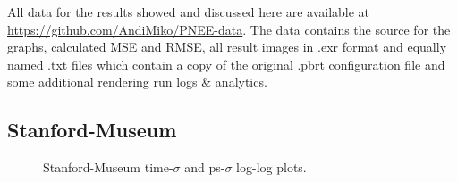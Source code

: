 All data for the results showed and discussed here are available at \url{https://github.com/AndiMiko/PNEE-data}. The data contains the source for the graphs, calculated MSE and RMSE, all result images in .exr format and equally named .txt files which contain a copy of the original .pbrt configuration file and some additional rendering run logs \& analytics.

\subsection{Stanford-Museum}

\begin{figure}
    \centering
    \begin{subfigure}{.5\textwidth}
      \centering
        \caption{}
        \label{fig:smmain_t}
    \end{subfigure}%
    \begin{subfigure}{.5\textwidth}
        \caption{}
        \label{fig:smmain_ps}
    \end{subfigure}
    \caption{Stanford-Museum time-$\sigma$ and ps-$\sigma$ log-log plots.}
    \label{fig:smmain}
\end{figure}


